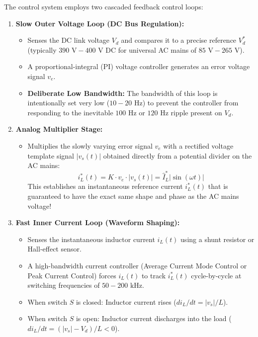\documentclass[11pt,a4paper]{article}
\begin{document}
The control system employs two cascaded feedback control loops:
\begin{enumerate}[leftmargin=*]
  \item \textbf{Slow Outer Voltage Loop (DC Bus Regulation):}
  \begin{itemize}
    \item Senses the DC link voltage $V_d$ and compares it to a precise reference $V_d^*$ (typically $390\text{ V} - 400\text{ V}$ DC for universal AC mains of $85\text{ V} - 265\text{ V}$).
    \item A proportional-integral (PI) voltage controller generates an error voltage signal $v_e$.
    \item \textbf{Deliberate Low Bandwidth:} The bandwidth of this loop is intentionally set very low ($10 - 20\text{ Hz}$) to prevent the controller from responding to the inevitable $100\text{ Hz}$ or $120\text{ Hz}$ ripple present on $V_d$.
  \end{itemize}

  \item \textbf{Analog Multiplier Stage:}
  \begin{itemize}
    \item Multiplies the slowly varying error signal $v_e$ with a rectified voltage template signal $|v_s(t)|$ obtained directly from a potential divider on the AC mains:
    \begin{equation}
    i_L^*(t) = K \cdot v_e \cdot |v_s(t)| = \hat{I}_L^* |\sin(\omega t)|
    \end{equation}
    This establishes an instantaneous reference current $i_L^*(t)$ that is guaranteed to have the exact same shape and phase as the AC mains voltage!
  \end{itemize}

  \item \textbf{Fast Inner Current Loop (Waveform Shaping):}
  \begin{itemize}
    \item Senses the instantaneous inductor current $i_L(t)$ using a shunt resistor or Hall-effect sensor.
    \item A high-bandwidth current controller (Average Current Mode Control or Peak Current Control) forces $i_L(t)$ to track $i_L^*(t)$ cycle-by-cycle at switching frequencies of $50 - 200\text{ kHz}$.
    \item When switch $S$ is closed: Inductor current rises ($di_L/dt = |v_s|/L$).
    \item When switch $S$ is open: Inductor current discharges into the load ($di_L/dt = (|v_s| - V_d)/L < 0$).
  \end{itemize}
\end{enumerate}
\end{document}
